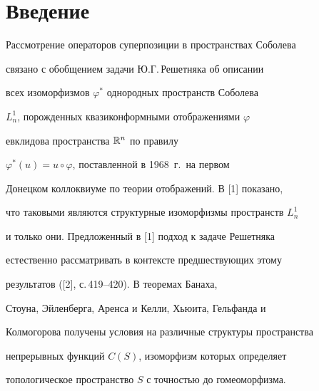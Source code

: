 \date{}




\pagestyle{plain} %







\maketitle


\label{begin}











\section*{Введение}





Рассмотрение операторов суперпозиции в пространствах Соболева


связано с обобщением задачи Ю.Г.\,Решетняка об описании


всех изоморфизмов $\varphi^*$ однородных пространств Соболева


$L_n^1$, порожденных квазиконформными отображениями $\varphi$


евклидова пространства ${\Bbb R}^n$ по правилу


$\varphi^*(u)=u\circ\varphi$, поставленной в 1968~г.\ на первом


Донецком коллоквиуме по теории отображений. В [1] показано,


что таковыми являются структурные изоморфизмы пространств $L_n^1$


и только они. Предложенный в [1] подход к задаче Решетняка


естественно рассматривать в контексте предшествующих этому


результатов ([2], с.\,419--420). В теоремах Банаха,


Стоуна, Эйленберга, Аренса и Келли, Хьюита, Гельфанда и


Колмогорова получены условия на различные структуры пространства


непрерывных функций $C(S)$, изоморфизм которых определяет


топологическое пространство $S$ с точностью до гомеоморфизма.


